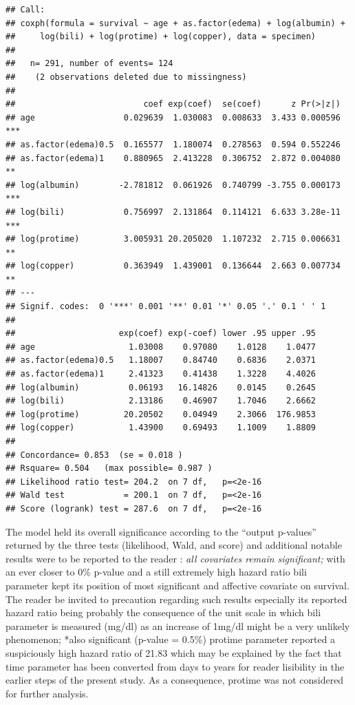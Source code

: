 \documentclass[]{article}
\begin{document}
\begin{verbatim}
## Call:
## coxph(formula = survival ~ age + as.factor(edema) + log(albumin) + 
##     log(bili) + log(protime) + log(copper), data = specimen)
## 
##   n= 291, number of events= 124 
##    (2 observations deleted due to missingness)
## 
##                          coef exp(coef)  se(coef)      z Pr(>|z|)    
## age                  0.029639  1.030083  0.008633  3.433 0.000596 ***
## as.factor(edema)0.5  0.165577  1.180074  0.278563  0.594 0.552246    
## as.factor(edema)1    0.880965  2.413228  0.306752  2.872 0.004080 ** 
## log(albumin)        -2.781812  0.061926  0.740799 -3.755 0.000173 ***
## log(bili)            0.756997  2.131864  0.114121  6.633 3.28e-11 ***
## log(protime)         3.005931 20.205020  1.107232  2.715 0.006631 ** 
## log(copper)          0.363949  1.439001  0.136644  2.663 0.007734 ** 
## ---
## Signif. codes:  0 '***' 0.001 '**' 0.01 '*' 0.05 '.' 0.1 ' ' 1
## 
##                     exp(coef) exp(-coef) lower .95 upper .95
## age                   1.03008    0.97080    1.0128    1.0477
## as.factor(edema)0.5   1.18007    0.84740    0.6836    2.0371
## as.factor(edema)1     2.41323    0.41438    1.3228    4.4026
## log(albumin)          0.06193   16.14826    0.0145    0.2645
## log(bili)             2.13186    0.46907    1.7046    2.6662
## log(protime)         20.20502    0.04949    2.3066  176.9853
## log(copper)           1.43900    0.69493    1.1009    1.8809
## 
## Concordance= 0.853  (se = 0.018 )
## Rsquare= 0.504   (max possible= 0.987 )
## Likelihood ratio test= 204.2  on 7 df,   p=<2e-16
## Wald test            = 200.1  on 7 df,   p=<2e-16
## Score (logrank) test = 287.6  on 7 df,   p=<2e-16
\end{verbatim}

The model held its overall significance according to the ``output
p-values'' returned by the three tests (likelihood, Wald, and score) and
additional notable results were to be reported to the reader : \emph{all
covariates remain significant; }with an ever closer to 0\% p-value and a
still extremely high hazard ratio bili parameter kept its position of
most significant and affective covariate on survival. The reader be
invited to precaution regarding such results especially its reported
hazard ratio being probably the consequence of the unit scale in which
bili parameter is measured (mg/dl) as an increase of 1mg/dl might be a
very unlikely phenomenon; *also significant (p-value = 0.5\%) protime
parameter reported a suspiciously high hazard ratio of 21.83 which may
be explained by the fact that time parameter has been converted from
days to years for reader lisibility in the earlier steps of the present
study. As a consequence, protime was not considered for further
analysis.
\end{document}
